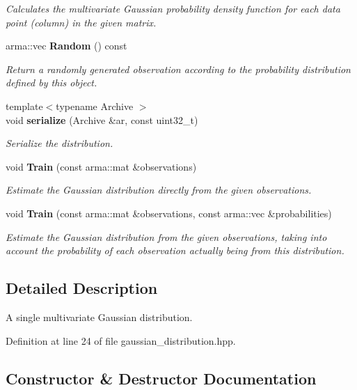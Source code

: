\begin{DoxyCompactItemize}
\begin{DoxyCompactList}\small\item\em Calculates the multivariate Gaussian probability density function for each data point (column) in the given matrix. \end{DoxyCompactList}\item 
arma\+::vec \textbf{ Random} () const
\begin{DoxyCompactList}\small\item\em Return a randomly generated observation according to the probability distribution defined by this object. \end{DoxyCompactList}\item 
{\footnotesize template$<$typename Archive $>$ }\\void \textbf{ serialize} (Archive \&ar, const uint32\+\_\+t)
\begin{DoxyCompactList}\small\item\em Serialize the distribution. \end{DoxyCompactList}\item 
void \textbf{ Train} (const arma\+::mat \&observations)
\begin{DoxyCompactList}\small\item\em Estimate the Gaussian distribution directly from the given observations. \end{DoxyCompactList}\item 
void \textbf{ Train} (const arma\+::mat \&observations, const arma\+::vec \&probabilities)
\begin{DoxyCompactList}\small\item\em Estimate the Gaussian distribution from the given observations, taking into account the probability of each observation actually being from this distribution. \end{DoxyCompactList}\end{DoxyCompactItemize}


\subsection{Detailed Description}
A single multivariate Gaussian distribution. 

Definition at line 24 of file gaussian\+\_\+distribution.\+hpp.



\subsection{Constructor \& Destructor Documentation}
\mbox{\label{classmlpack_1_1distribution_1_1GaussianDistribution_a53336d1b90883f2d488956588e1b3a92}} 
